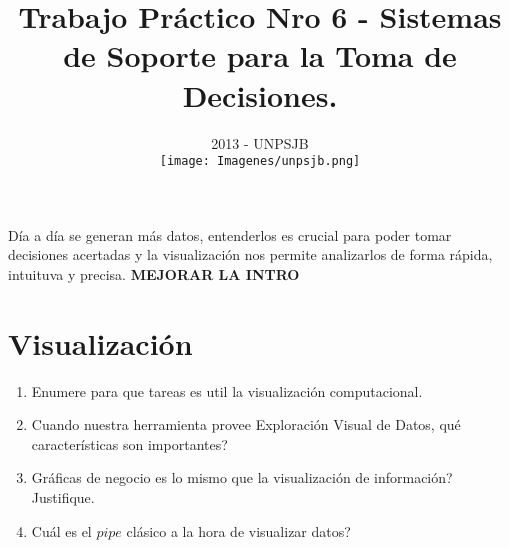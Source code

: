 \documentclass{article}
\begin{document}
\begin{large}
\title{\bf {Trabajo Práctico Nro 6 - Sistemas de Soporte para la Toma de Decisiones.}}
\end{large}
\date{2013 - UNPSJB\\[1cm]\texttt{[image: Imagenes/unpsjb.png]}}

\maketitle
\newpage


Día a día se generan más datos, entenderlos es crucial para poder tomar decisiones acertadas y la
visualización nos permite analizarlos de forma rápida, intuituva y precisa. \textbf{MEJORAR LA INTRO}

\section{Visualización}
\begin{enumerate}
\item Enumere para que tareas es util la visualización computacional.
\item Cuando nuestra herramienta provee Exploración Visual de Datos, qué características son importantes?
\item Gráficas de negocio es lo mismo que la visualización de información? Justifique.
\item Cuál es el $pipe$ clásico a la hora de visualizar datos?
\end{enumerate}
\end{document}
